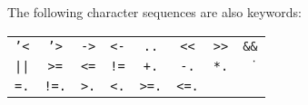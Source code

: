 \medskip
The following character sequences are also keywords:

\begin{tabular}[c]{cccccccc}
\texttt{'<} & \texttt{'>} & \texttt{->} & \texttt{<-} & \texttt{..} & \texttt{<<} & \texttt{>>} & \texttt{\&\&} \\
\texttt{||} & \texttt{>=} & \texttt{<=} & \texttt{!=} & \texttt{+.} & \texttt{-.} & \texttt{*.} & \texttt{\.} \\
\texttt{=.} &\texttt{!=.} &\texttt{>.} &\texttt{<.} &\texttt{>=.} &\texttt{<=.}
\end{tabular}

